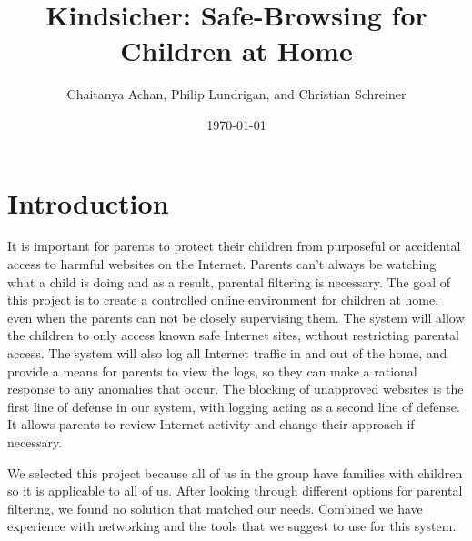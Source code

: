 \documentclass[12pt] {article}
\begin{document}
\title{Kindsicher: Safe-Browsing for Children at Home}
\author{Chaitanya Achan, Philip Lundrigan, and Christian Schreiner}
\date \today
\maketitle
\setcounter{page}{1}

%
%
%
%
%
%
%

\section*{Introduction}
It is important for parents to protect their children from purposeful or
accidental access to harmful websites on the Internet. Parents can't always be
watching what a child is doing and as a result, parental filtering is
necessary. The goal of this project is to create a controlled online
environment for children at home, even when the parents can not be closely
supervising them. The system will allow the children to only access known safe
Internet sites, without restricting parental access. The system will also log
all Internet traffic in and out of the home, and provide a means for parents to
view the logs, so they can make a rational response to any anomalies that
occur. The blocking of unapproved websites is the first line of defense in our system,
with logging acting as a second line of defense. It allows parents to review
Internet activity and change their approach if necessary.

We selected this project because all of us in the group have families with
children so it is applicable to all of us. After looking through different
options for parental filtering, we found no solution that matched our needs.
Combined we have experience with networking and the tools that we suggest to
use for this system.
\end{document}
